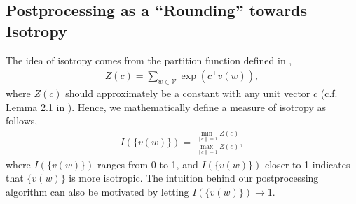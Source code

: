 \documentclass{article} \usepackage{acl2017,times}
\begin{document}
{
\subsection{Postprocessing as a ``Rounding'' towards Isotropy}
\label{app:rounding}

The idea of isotropy comes from the partition function defined in \citep{arora2015rand}, 
\begin{align*}
    Z(c) = \sum_{w\in \mathcal{V}}\exp\left(c^{\top}v(w)\right),
\end{align*}
where $Z(c)$ should approximately be a constant with any unit vector $c$ (c.f. Lemma 2.1 in \citep{arora2015rand}). Hence, we mathematically define a measure of isotropy as follows,
\begin{align}
    I(\{v(w)\}) = \frac{\min_{\|c\| = 1} Z(c)}{\max_{\|c\|=1} Z(c)}, \label{eq:iso_def}
\end{align}
where $I(\{v(w)\})$ ranges from 0 to 1, and $I(\{v(w)\})$ closer to 1 indicates that $\{v(w)\}$ is more isotropic. The intuition behind our postprocessing algorithm can also be motivated by letting $I(\{v(w)\}) \to 1$. 


}
\end{document}
